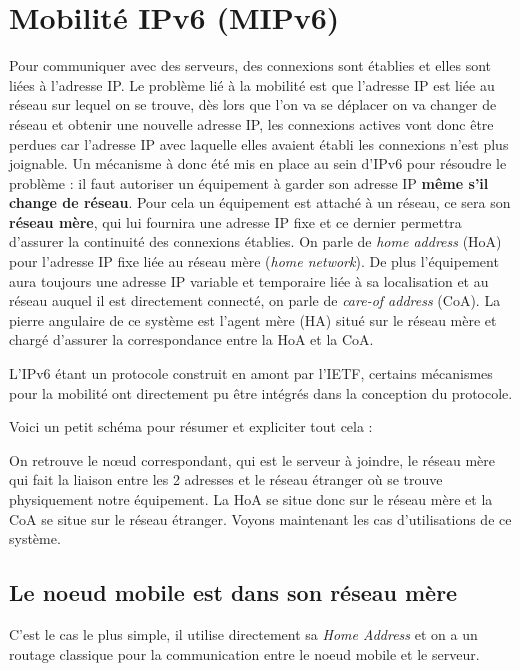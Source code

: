 \section{Mobilité IPv6 (MIPv6)}


Pour communiquer avec des serveurs, des connexions sont établies et elles sont liées à l’adresse IP.
Le problème lié à la mobilité est que l’adresse IP est liée au réseau sur lequel on se trouve, dès lors que l’on va se déplacer on va changer de réseau et obtenir une nouvelle adresse IP, les connexions actives vont donc être perdues car l’adresse IP avec laquelle elles avaient établi les connexions n’est plus joignable.
Un mécanisme à donc été mis en place au sein d’IPv6 pour résoudre le problème : il faut autoriser un équipement à garder son adresse IP \textbf{même s’il change de réseau}.
Pour cela un équipement est attaché à un réseau, ce sera son \textbf{réseau mère}, qui lui fournira une adresse IP fixe et ce dernier permettra d’assurer la continuité des connexions établies.
On parle de \emph{home address} (HoA) pour l’adresse IP fixe liée au réseau mère (\emph{home network}).
De plus l’équipement aura toujours une adresse IP variable et temporaire liée à sa localisation et au réseau auquel il est directement connecté, on parle de \emph{care-of address} (CoA).
La pierre angulaire de ce système est l’agent mère (HA) situé sur le réseau mère et chargé d’assurer la correspondance entre la HoA et la CoA.

L’IPv6 étant un protocole construit en amont par l’IETF, certains mécanismes pour la mobilité ont directement pu être intégrés dans la conception du protocole.

Voici un petit schéma pour résumer et expliciter tout cela :


On retrouve le nœud correspondant, qui est le serveur à joindre, le réseau mère qui fait la liaison entre les 2 adresses et le réseau étranger où se trouve physiquement notre équipement.
La HoA se situe donc sur le réseau mère et la CoA se situe sur le réseau étranger.
Voyons maintenant les cas d’utilisations de ce système.

\subsection{Le noeud mobile est dans son réseau mère}

C’est le cas le plus simple, il utilise directement sa \emph{Home Address} et on a un routage classique pour la communication entre le noeud mobile et le serveur.

